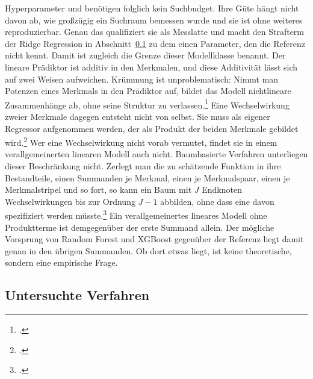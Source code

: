 \documentclass[12pt,a4paper]{article}
\begin{document}
Hyperparameter und benötigen folglich kein Suchbudget. Ihre Güte hängt nicht davon ab, wie großzügig
ein Suchraum bemessen wurde und sie ist ohne weiteres reproduzierbar. Genau das qualifiziert sie als
Messlatte und macht den Strafterm der Ridge Regression in
Abschnitt~\ref{sec:untersuchte-verfahren} zu dem einen Parameter, den die Referenz nicht kennt.
Damit ist zugleich die Grenze dieser Modellklasse benannt. Der lineare Prädiktor ist additiv in den
Merkmalen, und diese Additivität lässt sich auf zwei Weisen aufweichen. Krümmung ist unproblematisch:
Nimmt man Potenzen eines Merkmals in den Prädiktor auf, bildet das Modell nichtlineare Zusammenhänge
ab, ohne seine Struktur zu verlassen.\footcite[98-99]{James2023} Eine Wechselwirkung zweier Merkmale
dagegen entsteht nicht von selbst. Sie muss als eigener Regressor aufgenommen werden, der als Produkt
der beiden Merkmale gebildet wird.\footcite[95]{James2023} Wer eine Wechselwirkung nicht vorab
vermutet, findet sie in einem verallgemeinerten linearen Modell auch nicht.
Baumbasierte Verfahren unterliegen dieser Beschränkung nicht. Zerlegt man die zu schätzende Funktion in
ihre Bestandteile, einen Summanden je Merkmal, einen je Merkmalspaar, einen je Merkmalstripel und so
fort, so kann ein Baum mit $J$ Endknoten Wechselwirkungen bis zur Ordnung $J-1$
abbilden, ohne dass eine davon spezifiziert werden müsste.\footcite[362]{Hastie2009} Ein verallgemeinertes lineares Modell
ohne Produktterme ist demgegenüber der erste Summand allein. Der mögliche Vorsprung von Random Forest
und XGBoost gegenüber der Referenz liegt damit genau in den übrigen Summanden. Ob dort etwas liegt,
ist keine theoretische, sondern eine empirische Frage.
\subsection{Untersuchte Verfahren}
\label{sec:untersuchte-verfahren}
\end{document}
